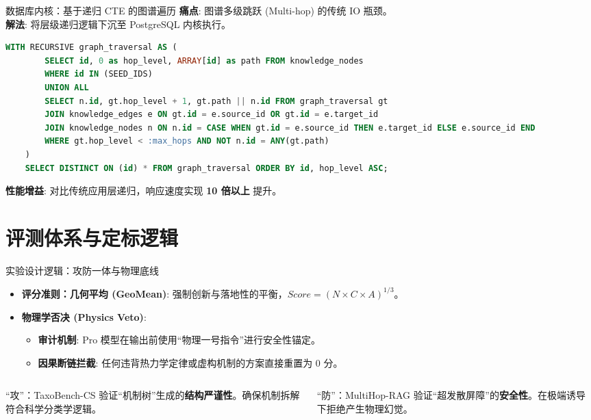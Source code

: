 \documentclass[aspectratio=169, 11pt]{ctexbeamer}
\begin{document}
\begin{frame}[fragile]{数据库内核：基于递归 CTE 的图谱遍历}
    \textbf{痛点}: 图谱多级跳跃 (Multi-hop) 的传统 IO 瓶颈。\\
    \textbf{解法}: 将层级递归逻辑下沉至 PostgreSQL 内核执行。
    \begin{lstlisting}[language=SQL]
    WITH RECURSIVE graph_traversal AS (
        SELECT id, 0 as hop_level, ARRAY[id] as path FROM knowledge_nodes
        WHERE id IN (SEED_IDS)
        UNION ALL
        SELECT n.id, gt.hop_level + 1, gt.path || n.id FROM graph_traversal gt
        JOIN knowledge_edges e ON gt.id = e.source_id OR gt.id = e.target_id
        JOIN knowledge_nodes n ON n.id = CASE WHEN gt.id = e.source_id THEN e.target_id ELSE e.source_id END
        WHERE gt.hop_level < :max_hops AND NOT n.id = ANY(gt.path)
    )
    SELECT DISTINCT ON (id) * FROM graph_traversal ORDER BY id, hop_level ASC;
    \end{lstlisting}
    \vspace{0.1cm}
    \textbf{性能增益}: 对比传统应用层递归，响应速度实现 \textbf{10 倍以上} 提升。
\end{frame}

\section{评测体系与定标逻辑}

\begin{frame}{实验设计逻辑：攻防一体与物理底线}
    \begin{itemize}
        \item \textbf{评分准则：几何平均 (GeoMean)}: 强制创新与落地性的平衡，$Score = (N \times C \times A)^{1/3}$。
        \item \textbf{物理学否决 (Physics Veto)}: 
        \begin{itemize}
            \item \textbf{审计机制}: Pro 模型在输出前使用“物理一号指令”进行安全性锚定。
            \item \textbf{因果断链拦截}: 任何违背热力学定律或虚构机制的方案直接重置为 0 分。
        \end{itemize}
    \end{itemize}
    \begin{columns}
        \begin{column}{0.5\textwidth}
            \begin{exampleblock}{“攻”：TaxoBench-CS}
                验证“机制树”生成的\textbf{结构严谨性}。确保机制拆解符合科学分类学逻辑。
            \end{exampleblock}
        \end{column}
        \begin{column}{0.5\textwidth}
            \begin{alertblock}{“防”：MultiHop-RAG}
                验证“超发散屏障”的\textbf{安全性}。在极端诱导下拒绝产生物理幻觉。
            \end{alertblock}
        \end{column}
    \end{columns}
\end{frame}
\end{document}
